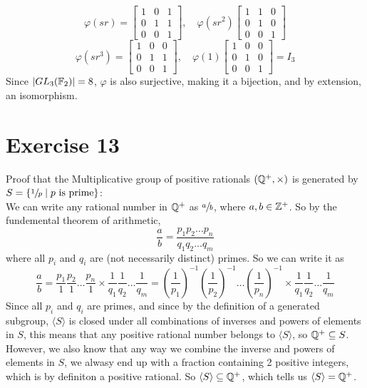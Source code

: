 \documentclass[12pt]{article}
\begin{document}
    \[ \varphi(sr) = \begin{bmatrix} 1 & 0 & 1 \\
        0 & 1 & 1 \\
        0 & 0 & 1 \end{bmatrix}, \quad
    \varphi(sr^2) \begin{bmatrix} 1 & 1 & 0 \\
        0 & 1 & 0 \\
        0 & 0 & 1 \end{bmatrix} \]
    \[ \varphi(sr^3) = \begin{bmatrix} 1 & 0 & 0 \\
        0 & 1 & 1 \\
        0 & 0 & 1 \end{bmatrix}, \quad
    \varphi(1) \begin{bmatrix} 1 & 0 & 0 \\
        0 & 1 & 0 \\
        0 & 0 & 1 \end{bmatrix} = I_3 \]
    Since $|GL_3(\mathbb{F}_2)| = 8$, $\varphi$ is also surjective,
    making it a bijection,
    and by extension, an isomorphism.


    \section*{Exercise 13}
    Proof that the Multiplicative group of positive rationals
    $(\mathbb{Q}^+, \times)$ is generated
    by $S = \{\sfrac{1}{p} \mid p \text{ is prime}\}$: \\
    We can write any rational number in $\mathbb{Q}^+$ as $\sfrac{a}{b}$,
    where $a, b \in \mathbb{Z}^+$.
    So by the fundemental theorem of arithmetic,
    \[ \dfrac{a}{b} = \dfrac{p_1p_2 \dots p_n}{q_1q_2 \dots q_m} \]
    where all $p_i$ and $q_i$ are (not necessarily distinct) primes.
    So we can write it as
    \[ \dfrac{a}{b}
    = \dfrac{p_1}{1}\dfrac{p_2}{1} \dots \dfrac{p_n}{1} \times
    \dfrac{1}{q_1}\dfrac{1}{q_2} \dots \dfrac{1}{q_m}
    = \left(\dfrac{1}{p_1}\right)^{-1} \left(\dfrac{1}{p_2}\right)^{-1}
    \dots \left(\dfrac{1}{p_n}\right)^{-1}
    \times \dfrac{1}{q_1}\dfrac{1}{q_2} \dots \dfrac{1}{q_m} \]
    Since all $p_i$ and $q_i$ are primes,
    and since by the definition of a generated subgroup,
    $\langle S \rangle$ is closed under all combinations of
    inverses and powers of elements in $S$,
    this means that any positive rational number belongs
    to $\langle S \rangle$,
    so $\mathbb{Q}^+ \subseteq S$. \\
    However, we also know that any way we combine
    the inverse and powers of elements in $S$,
    we alwasy end up with a fraction containing 2 positive integers,
    which is by definiton a positive rational.
    So $\langle S \rangle \subseteq \mathbb{Q}^+$,
    which tells us $\langle S \rangle = \mathbb{Q}^+$.
\end{document}
